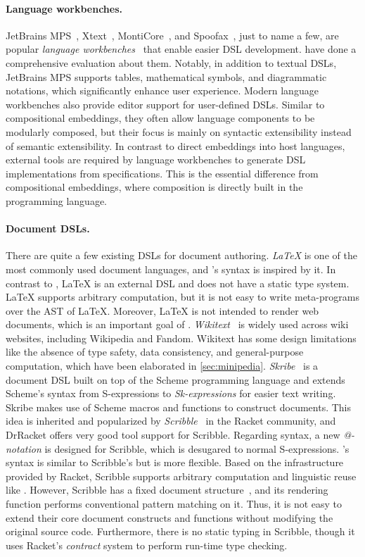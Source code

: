 \paragraph{Language workbenches.}
JetBrains MPS~\citep{mps}, Xtext~\citep{xtext},
MontiCore~\citep{krahn2010monticore}, and Spoofax~\citep{kats2010spoofax}, just
to name a few, are popular \emph{language
workbenches}~\citep{fowler2005language} that enable easier DSL development.
\citet{erdweg2015evaluating} have done a comprehensive evaluation about them.
Notably, in addition to textual DSLs, JetBrains MPS supports tables,
mathematical symbols, and diagrammatic notations, which significantly enhance
user experience. Modern language workbenches also provide editor support for
user-defined DSLs. Similar to compositional embeddings, they often allow
language components to be modularly composed, but their focus is mainly on
syntactic extensibility instead of semantic extensibility. In contrast to direct
embeddings into host languages, external tools are required by language
workbenches to generate DSL implementations from specifications. This is the
essential difference from compositional embeddings, where composition is
directly built in the programming language.

\paragraph{Document DSLs.}
There are quite a few existing DSLs for document authoring. \emph{\LaTeX} is one
of the most commonly used document languages, and \ExT's syntax is inspired by
it. In contrast to \ExT, \LaTeX{} is an external DSL and does not have a static
type system. \LaTeX{} supports arbitrary computation, but it is not easy to
write meta-programs over the AST of \LaTeX. Moreover, \LaTeX{} is not intended
to render web documents, which is an important goal of \ExT.
\emph{Wikitext}~\citep{wikitext} is widely used across wiki websites, including
Wikipedia and Fandom. Wikitext has some design limitations like the absence of
type safety, data consistency, and general-purpose computation, which have been
elaborated in \autoref{sec:minipedia}. \emph{Skribe}~\citep{gallesio2005skribe}
is a document DSL built on top of the Scheme programming language and extends
Scheme's syntax from S-expressions to \emph{Sk-expressions} for easier text
writing. Skribe makes use of Scheme macros and functions to construct documents.
This idea is inherited and popularized by
\emph{Scribble}~\citep{flatt2009scribble} in the Racket community, and DrRacket
offers very good tool support for Scribble. Regarding syntax, a new
\emph{@-notation} is designed for Scribble, which is desugared to normal
S-expressions. \ExT's syntax is similar to Scribble's but is more flexible.
Based on the infrastructure provided by Racket, Scribble supports arbitrary
computation and linguistic reuse like \ExT. However, Scribble has a fixed
document structure~\citep{scribble}, and its rendering function performs
conventional pattern matching on it. Thus, it is not easy to extend their core
document constructs and functions without modifying the original source code.
Furthermore, there is no static typing in Scribble, though it uses Racket's
\emph{contract} system to perform run-time type checking.


